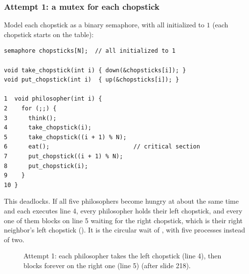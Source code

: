 \subsubsection{Attempt 1: a mutex for each chopstick}
Model each chopstick as a binary semaphore, with all  initialized to $1$ (each chopstick starts on the table):
\begin{lstlisting}
semaphore chopsticks[N];  // all initialized to 1

void take_chopstick(int i) { down(&chopsticks[i]); }
void put_chopstick(int i)  { up(&chopsticks[i]); }

1  void philosopher(int i) {
2    for (;;) {
3      think();
4      take_chopstick(i);
5      take_chopstick((i + 1) % N);
6      eat();                        // critical section
7      put_chopstick((i + 1) % N);
8      put_chopstick(i);
9    }
10 }
\end{lstlisting}
This deadlocks. If all five philosophers become hungry at about the same time and each executes line 4, every philosopher holds their left chopstick, and every one of them blocks on line 5 waiting for the right chopstick, which is their right neighbor's left chopstick (). It is the circular wait of , with five processes instead of two.

\begin{figure}[htbp]
\centering
{}
\caption{Attempt 1: each philosopher takes the left chopstick (line 4), then blocks forever on the right one (line 5) (after slide 218).}
\label{fig:philo1}
\end{figure}

